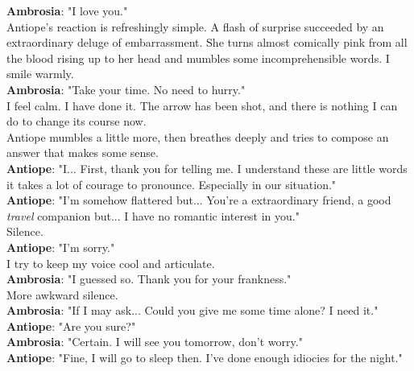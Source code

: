 \documentclass{report}
\newcommand{\speaker}[1]{
	\textbf{#1}: 
}
\begin{document}
\speaker{Ambrosia} "I love you."\\

Antiope's reaction is refreshingly simple. A flash of surprise succeeded by an extraordinary deluge of embarrassment. She turns almost comically pink from all the blood rising up to her head and mumbles some incomprehensible words. I smile warmly.\\

\speaker{Ambrosia} "Take your time. No need to hurry."\\

I feel calm. I have done it. The arrow has been shot, and there is nothing I can do to change its course now.\\

Antiope mumbles a little more, then breathes deeply and tries to compose an answer that makes some sense.\\

\speaker{Antiope} "I... First, thank you for telling me. I understand these are little words it takes a lot of courage to pronounce. Especially in our situation."\\

\speaker{Antiope} "I'm somehow flattered but... You're a extraordinary friend, a good \emph{travel} companion but... I have no romantic interest in you."\\

Silence.\\

\speaker{Antiope} "I'm sorry."\\

I try to keep my voice cool and articulate.\\

\speaker{Ambrosia} "I guessed so. Thank you for your frankness."\\

More awkward silence.\\

\speaker{Ambrosia} "If I may ask... Could you give me some time alone? I need it."\\

\speaker{Antiope} "Are you sure?"\\

\speaker{Ambrosia} "Certain. I will see you tomorrow, don't worry."\\

\speaker{Antiope} "Fine, I will go to sleep then. I've done enough idiocies for the night."\\
\end{document}
